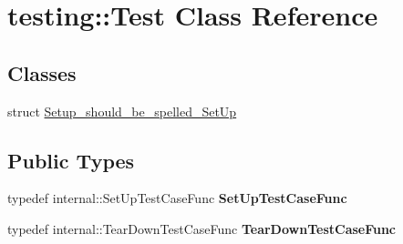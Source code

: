 \hypertarget{classtesting_1_1_test}{}\section{testing\+:\+:Test Class Reference}
\label{classtesting_1_1_test}
\subsection*{Classes}
\begin{DoxyCompactItemize}
\item 
struct \hyperlink{structtesting_1_1_test_1_1_setup__should__be__spelled___set_up}{Setup\+\_\+should\+\_\+be\+\_\+spelled\+\_\+\+Set\+Up}
\end{DoxyCompactItemize}
\subsection*{Public Types}
\begin{DoxyCompactItemize}
\item 
\mbox{\label{classtesting_1_1_test_a5f2a051d1d99c9b784c666c586186cf9}} 
typedef internal\+::\+Set\+Up\+Test\+Case\+Func {\bfseries Set\+Up\+Test\+Case\+Func}
\item 
\mbox{\label{classtesting_1_1_test_aa0f532e93b9f3500144c53f31466976c}} 
typedef internal\+::\+Tear\+Down\+Test\+Case\+Func {\bfseries Tear\+Down\+Test\+Case\+Func}
\end{DoxyCompactItemize}
